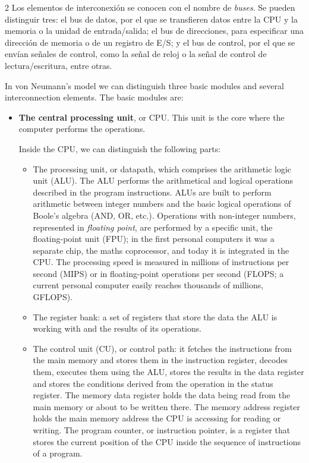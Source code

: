 \begin{paracol}{2}
Los elementos de interconexión se conocen con el nombre de \emph{buses}. Se pueden distinguir tres: el bus de datos, por el que se transfieren datos entre la CPU y la memoria o la unidad de entrada/salida; el bus de direcciones, para especificar una dirección de memoria o de un registro de E/S; y el bus de control, por el que se envían señales de control, como la señal de reloj o la señal de control de lectura/escritura, entre otras.

\switchcolumn
In von Neumann's model we can distinguish three basic modules and several interconnection elements. The basic modules are:

\begin{itemize}
\item \textbf{The central processing unit}, or CPU.  This unit is the core where the computer performs the operations.

Inside the CPU, we can distinguish the following parts:

\begin{itemize}

\item The processing unit, or datapath, which comprises the arithmetic logic unit (ALU).  The ALU performs the arithmetical and logical operations described in the program instructions. ALUs are built to perform arithmetic between integer numbers and the basic logical operations of Boole's algebra (AND, OR, etc.). Operations with non-integer numbers, represented in \emph{floating point}, are performed by a specific unit, the floating-point unit (FPU); in the first personal computers it was a separate chip, the maths coprocessor, and today it is integrated in the CPU. The processing speed is measured in millions of instructions per second (MIPS) or in floating-point operations per second (FLOPS; a current personal computer easily reaches thousands of millions, GFLOPS).

\item The register bank: a set of registers that store the data the ALU is working with and the results of its operations.

\item The control unit (CU), or control path: it fetches the instructions from the main memory and stores them in the instruction register, decodes them, executes them using the ALU, stores the results in the data register and stores the conditions derived from the operation in the status register. The memory data register holds the data being read from the main memory or about to be written there. The memory address register holds the main memory address the CPU is accessing for reading or writing. The program counter, or instruction pointer, is a register that stores the current position of the CPU inside the sequence of instructions of a program.
\end{itemize}


\end{itemize}
\end{paracol}
